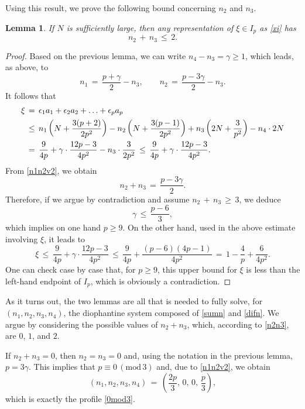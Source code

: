 \documentclass{amsart}
\newtheorem{lemma}[theorem]{Lemma}
\begin{document}
Using this result, we prove the following bound concerning $n_2$ and $n_3$.

\begin{lemma}
If $N$ is sufficiently large, then any representation of $\xi\in I_p$ as \eqref{xi} has
\begin{equation}
n_2\,+\,n_3\,\leq\, 2.
\label{n2n3}
\end{equation}
\end{lemma} 

\begin{proof}
Based on the previous lemma, we can write $n_4-n_3=\gamma\geq 1$, which leads, as above, to
\begin{equation}
n_1\,=\,\frac{p+\gamma}{2} - n_3, \qquad n_2\,=\,\frac{p-3\gamma}{2} - n_3.
\label{n1n2v2}
\end{equation}
It follows that
\[
\aligned
\xi\,&=\,  \epsilon_1 a_1+\epsilon_2 a_2+ \ldots+\epsilon_p a_p\\ 
&\leq\, n_1\left(N+ \frac{3(p+2)}{2p^2}\right) - n_2 \left(N+\frac{3(p-1)}{2p^2}\right) + n_3\left(2N +\frac{3}{p^2}\right) - n_4\cdot 2N\\
&=\,\frac{9}{4p} + \gamma \cdot \frac{12p-3}{4p^2} - n_3\cdot \frac{3}{2p^2}\,\leq\,\frac{9}{4p} + \gamma \cdot \frac{12p-3}{4p^2}.\endaligned
\]
From \eqref{n1n2v2}, we obtain
\[
n_2+n_3\,=\,\frac{p-3\gamma}{2}.\]
Therefore, if we argue by contradiction and assume $n_2\,+\,n_3\,\geq\, 3$, we deduce
\[
\gamma \,\leq\, \frac{p-6}{3},
\]
which implies on one hand $p\geq 9$. On the other hand, used in the above estimate involving $\xi$, it leads to 
\[
\xi\,\leq\, \frac{9}{4p} + \gamma \cdot \frac{12p-3}{4p^2}\,\leq\,\frac{9}{4p} +  \frac{(p-6)(4p-1)}{4p^2}\,=\, 1-\frac{4}{p}+\frac{6}{4p^2}.\] 
One can check case by case that, for $p\geq 9$, this upper bound for $\xi$ is less than the left-hand endpoint of $I_p$, which is obviously a contradiction. 
\end{proof}

As it turns out, the two lemmas are all that is needed to fully solve, for \\
$(n_1, n_2, n_3, n_4)$, the diophantine system composed of \eqref{sumn} and \eqref{difn}. We argue by considering the possible values of $n_2+n_3$, which, according to \eqref{n2n3}, are $0$, $1$, and $2$.

If $n_2+n_3=0$, then $n_2=n_3=0$ and, using the notation in the previous lemma, $p=3\gamma$. This implies that $ p\equiv 0\, (\text{mod}\,3)$ and, due to \eqref{n1n2v2}, we obtain
\[
(n_1,n_2,n_3,n_4)\,=\,\left(\frac{2p}{3},\,0,\,0,\,\frac{p}{3}\right),
\]
which is exactly the profile \eqref{0mod3}.
\end{document}
